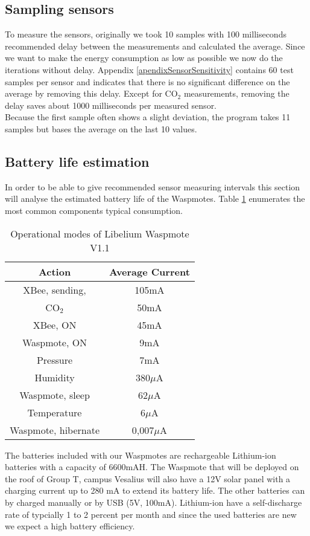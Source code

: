 \subsection{Sampling sensors}
To measure the sensors, originally we took 10 samples with 100 milliseconds recommended delay between the measurements and calculated the average. Since we want to make the energy consumption as low as possible we now do the iterations without delay. Appendix \ref{apendixSensorSensitivity} contains 60 test samples per sensor and indicates that there is no significant difference on the average by removing this delay. Except for CO$_{2}$ measurements, removing the delay saves about 1000 milliseconds per measured sensor.\\ 
Because the first sample often shows a slight deviation, the program takes 11 samples but bases the average on the last 10 values.
\subsection{Battery life estimation}
In order to be able to give recommended sensor measuring intervals this section will analyse the estimated battery life of the Waspmotes. Table \ref{tab:cons2} enumerates the most common components typical consumption.
\begin{table}[!ht]
\begin{center}
\begin{tabular}[!ht]{|c|c|}
\hline
\textbf{Action} & \textbf{Average Current}\\
\hline
XBee, sending, & 105mA\\
\hline
CO$_{2}$ & 50mA\\
\hline
XBee, ON & 45mA\\
\hline
Waspmote, ON & 9mA\\
\hline
Pressure & 7mA\\
\hline
Humidity & 380$\mu$A\\
\hline
Waspmote, sleep & 62$\mu$A\\
\hline
Temperature & 6$\mu$A\\
\hline
Waspmote, hibernate & 0,007$\mu$A\\
\hline
\end{tabular}
\caption{Operational modes of Libelium Waspmote V1.1}
\label{tab:cons2}
\end{center}
\end{table}
The batteries included with our Waspmotes are rechargeable Lithium-ion batteries with a capacity of 6600mAH. The Waspmote that will be deployed on the roof of Group T, campus Vesalius will also have a 12V solar panel with a charging current up to 280 mA to extend its battery life. The other batteries can by charged manually or by USB (5V, 100mA). Lithium-ion have a self-discharge rate of typcially 1 to 2 percent per month and since the used batteries are new we expect a high battery efficiency.\\
